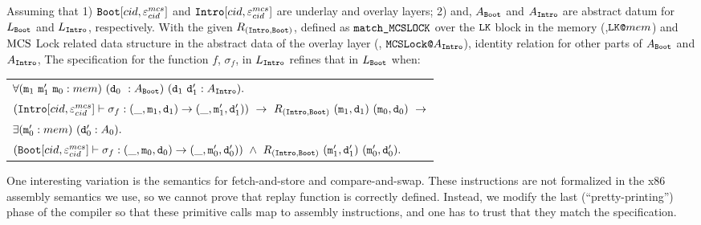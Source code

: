  \begin{theorem}
 \label{thm:chapter:mcslock:machine-state-refinement-full} 
Assuming that 
 1) ${{\mathrm{\texttt{Boot}}}}[cid, {\varepsilon}^{mcs}_{cid}]$ and ${{\mathrm{\texttt{Intro}}}}[cid, {\varepsilon}^{mcs}_{cid}]$ are underlay and overlay layers;
2) and, $A_{{\mathrm{\texttt{Boot}}}}$ and $A_{{\mathrm{\texttt{Intro}}}}$ are abstract datum for $L_{{\mathrm{\texttt{Boot}}}}$ and $L_{{\mathrm{\texttt{Intro}}}}$, respectively.
    With the given $R_{({\mathrm{\texttt{Intro}}}, {\mathrm{\texttt{Boot}}})}$, defined as ${\mathrm{\texttt{match\_MCSLOCK}}}$
     over the ${\mathrm{\texttt{LK}}}$ block in the memory  (\ie,${\mathrm{\texttt{LK}}}{\mathrm{\texttt{@}}}mem$) and 
 $\mathrm{MCS}$ Lock related data structure in the abstract data of the overlay layer (\ie, ${\mathrm{\texttt{MCSLock}}}{\mathrm{\texttt{@}}}A_{{\mathrm{\texttt{Intro}}}}$), 
 identity relation for other parts of $A_{{\mathrm{\texttt{Boot}}}}$ and $A_{{\mathrm{\texttt{Intro}}}}$, 
 The specification for the function $f$, $\sigma_f$, in $L_{{\mathrm{\texttt{Intro}}}}$ refines that in $L_{{\mathrm{\texttt{Boot}}}}$ when:
 \begin{center}
 \begin{tabular}{P{0.95\textwidth}}
$ \forall (\codeinmath{{m}}_{1} \ \codeinmath{{m}}_{1}'\ \codeinmath{{m}}_{0} : mem)\  (\codeinmath{{d}}_{0} \ : A_{\mmcsboot})\ (\codeinmath{{d}}_{1} \ \codeinmath{{d}}_{1}' : A_{\mmcslockintro}). $ \\
 $ (\mmcslockintro[cid, \oracle^{mcs}_{cid}] \vdash \sigma_f : (\_, \codeinmath{m}_1, \codeinmath{d}_1) \rightarrow (\_, \codeinmath{m}_1', \codeinmath{d}_1'))  \ \rightarrow \
  R_{(\mmcslockintro, \mmcsboot)}\ (\codeinmath{{m}}_1, \codeinmath{{d}}_1)\ (\codeinmath{{m}}_0, \codeinmath{{d}}_0) \ \rightarrow $\\
  $ \exists ({\mathrm{\texttt{{m}}}}_{0}' : mem)\ ({\mathrm{\texttt{{d}}}}_{0}' : A_0).$ \\
$({{\mathrm{\texttt{Boot}}}}[cid, {\varepsilon}^{mcs}_{cid}]  \vdash \sigma_f : (\_, {\mathrm{\texttt{m}}}_0, {\mathrm{\texttt{d}}}_0) \rightarrow (\_, {\mathrm{\texttt{m}}}_0', {\mathrm{\texttt{d}}}_0')) \ \wedge \
  R_{({\mathrm{\texttt{Intro}}}, {\mathrm{\texttt{Boot}}})}\ ({\mathrm{\texttt{{m}}}}'_1, {\mathrm{\texttt{{d}}}}'_1)\ ({\mathrm{\texttt{{m}}}}'_0, {\mathrm{\texttt{{d}}}}'_0).$  \\
 \end{tabular}
 \end{center}
 \end{theorem}



One interesting variation is the semantics
for fetch-and-store and compare-and-swap. These instructions are not
formalized in the x86 assembly semantics we use, so we cannot prove
that replay function is correctly defined. Instead, we modify the last
(``pretty-printing'') phase of the compiler so that these primitive calls map to assembly
instructions, and one has to trust that they match the specification.


